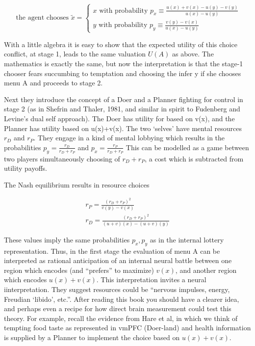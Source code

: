 \documentclass{article}
\begin{document}
\begin{equation*}
	\text { the agent chooses } \tilde{x}=\left\{\begin{array}{ll}
	x \text { with probability } p_{x} \equiv \frac{u(x)+v(x)-u(y)-v(y)}{u(x)-u(y)} \\
	y \text { with probability } p_{y} \equiv \frac{v(y)-v(x)}{u(x)-u(y)}
	\end{array}\right.
\end{equation*}

With a little algebra it is easy to show that the expected utility of this choice conflict, at stage 1, leads to the same valuation $U(A)$ as above. The mathematics is exactly the same, but now the interpretation is that the stage-1 chooser fears succumbing to temptation and choosing the infer y if she chooses menu A and proceeds to stage 2. 

Next they introduce the concept of a Doer and a Planner fighting for control in stage 2 (as in Shefrin and Thaler, 1981, and similar in spirit to Fudenberg and Levine’s dual self approach). The Doer has utility for based on v(x), and the Planner has utility based on u(x)+v(x).  The two ‘selves’ have mental resources $r_D$ and $r_P$. They engage in a kind of mental lobbying which results in the probabilities $p_y =\frac{r_D}{r_D+ r_P}$ and $p_x=\frac{r_P}{r_D+ r_P}$ This can be modelled as a game between two players simultaneously choosing of $r_D+ r_P$, a cost which is subtracted from utility payoffs.

The Nash equilibrium results in resource choices

\begin{equation*}
	\begin{array}{l}
	r_{P}=\frac{\left(r_{D}+r_{P}\right)^{2}}{v(y)-v(x)} \\
	r_{D}=\frac{\left(r_{D}+r_{P}\right)^{2}}{(u+v)(x)-(u+v)(y)}
	\end{array}
\end{equation*}

These values imply the same probabilities $p_x, p_y$ as in the internal lottery representation. 
Thus, in the first stage the evaluation of menu A can be interpreted as rational anticipation of an internal neural battle between one region which encodes (and “prefers” to maximize) $v(x)$, and another region which encodes $u(x)+v(x)$.
This interpretation invites a neural iinterpretation. They suggest resources could be “nervous impulses, energy, Freudian ‘libido’, etc.”.  
After reading this book you should have a clearer idea, and perhaps even a recipe for how direct brain measurement could test this theory.  For example, recall the evidence from Hare et al, in which we think of tempting food taste as represented in vmPFC (Doer-land) and health information is supplied by a Planner to implement the choice based on $u(x)+v(x)$. 
\end{document}
